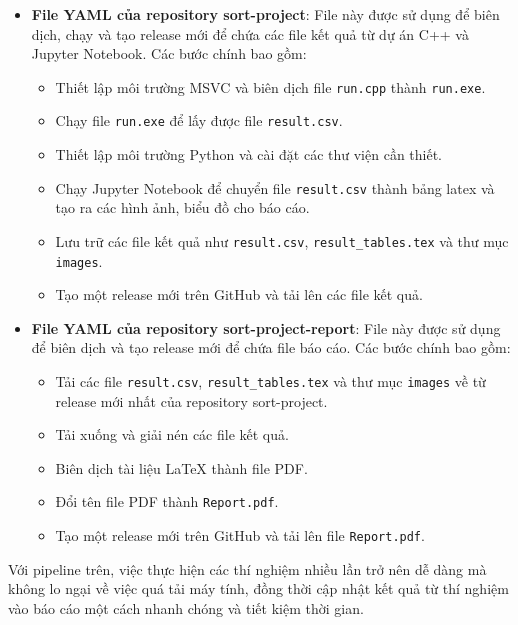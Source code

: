 \begin{itemize}
    \item \textbf{File YAML của repository sort-project}: File này được sử dụng để biên dịch, chạy và tạo release mới để chứa các file kết quả từ dự án C++ và Jupyter Notebook. Các bước chính bao gồm:
    \begin{itemize}
        \item Thiết lập môi trường MSVC và biên dịch file \texttt{run.cpp} thành \texttt{run.exe}.
        \item Chạy file \texttt{run.exe} để lấy được file \texttt{result.csv}.
        \item Thiết lập môi trường Python và cài đặt các thư viện cần thiết.
        \item Chạy Jupyter Notebook để chuyển file \texttt{result.csv} thành bảng latex và tạo ra các hình ảnh, biểu đồ cho báo cáo.
        \item Lưu trữ các file kết quả như \texttt{result.csv}, \texttt{result\_tables.tex} và thư mục \texttt{images}.
        \item Tạo một release mới trên GitHub và tải lên các file kết quả.
    \end{itemize}
    
    \item \textbf{File YAML của repository sort-project-report}: File này được sử dụng để biên dịch và tạo release mới để chứa file báo cáo. Các bước chính bao gồm:
    \begin{itemize}
        \item Tải các file \texttt{result.csv}, \texttt{result\_tables.tex} và thư mục \texttt{images} về từ release mới nhất của repository sort-project.
        \item Tải xuống và giải nén các file kết quả.
        \item Biên dịch tài liệu LaTeX thành file PDF.
        \item Đổi tên file PDF thành \texttt{Report.pdf}.
        \item Tạo một release mới trên GitHub và tải lên file \texttt{Report.pdf}.
    \end{itemize}
\end{itemize}

Với pipeline trên, việc thực hiện các thí nghiệm nhiều lần trở nên dễ dàng mà không lo ngại về việc quá tải máy tính, đồng thời cập nhật kết quả từ thí nghiệm vào báo cáo một cách nhanh chóng và tiết kiệm thời gian.